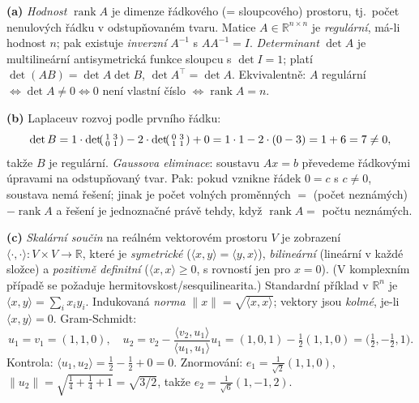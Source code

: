 \begin{reseni}
\textbf{(a)} \emph{Hodnost} $\operatorname{rank}A$ je dimenze řádkového (= sloupcového) prostoru, tj.\ počet nenulových řádku v odstupňovaném tvaru. Matice $A\in\mathbb{R}^{n\times n}$ je \emph{regulární}, má-li hodnost $n$; pak existuje \emph{inverzní} $A^{-1}$ s $AA^{-1}=I$. \emph{Determinant} $\det A$ je multilineární antisymetrická funkce sloupcu s $\det I=1$; platí $\det(AB)=\det A\det B$, $\det A^{\!\top}=\det A$. Ekvivalentně: $A$ regulární $\iff \det A\neq 0 \iff 0$ není vlastní číslo $\iff \operatorname{rank}A=n$.

\textbf{(b)} Laplaceuv rozvoj podle prvního řádku:
\[
\det B = 1\cdot\det\!\begin{psmallmatrix}1&3\\0&1\end{psmallmatrix} -2\cdot\det\!\begin{psmallmatrix}0&3\\1&1\end{psmallmatrix} +0 = 1\cdot 1 -2\cdot(0-3) = 1+6 = 7 \neq 0,
\]
takže $B$ je regulární. \emph{Gaussova eliminace}: soustavu $Ax=b$ převedeme řádkovými úpravami na odstupňovaný tvar. Pak: pokud vznikne řádek $0=c$ s $c\neq0$, soustava nemá řešení; jinak je počet volných proměnných $=$ (počet neznámých) $-\operatorname{rank}A$ a řešení je jednoznačné právě tehdy, když $\operatorname{rank}A=$ počtu neznámých.

\textbf{(c)} \emph{Skalární součin} na reálném vektorovém prostoru $V$ je zobrazení $\langle\cdot,\cdot\rangle:V\times V\to\mathbb{R}$, které je \emph{symetrické} ($\langle x,y\rangle=\langle y,x\rangle$), \emph{bilineární} (lineární v každé složce) a \emph{pozitivně definitní} ($\langle x,x\rangle\ge0$, s rovností jen pro $x=0$). (V komplexním případě se požaduje hermitovskost/sesquilinearita.) Standardní příklad v $\mathbb{R}^n$ je $\langle x,y\rangle=\sum_i x_iy_i$. Indukovaná \emph{norma} $\lVert x\rVert=\sqrt{\langle x,x\rangle}$; vektory jsou \emph{kolmé}, je-li $\langle x,y\rangle=0$. Gram-Schmidt:
\[
u_1=v_1=(1,1,0),\quad u_2=v_2-\frac{\langle v_2,u_1\rangle}{\langle u_1,u_1\rangle}u_1=(1,0,1)-\tfrac12(1,1,0)=\big(\tfrac12,-\tfrac12,1\big).
\]
Kontrola: $\langle u_1,u_2\rangle=\tfrac12-\tfrac12+0=0$. Znormování: $e_1=\tfrac1{\sqrt2}(1,1,0)$, $\lVert u_2\rVert=\sqrt{\tfrac14+\tfrac14+1}=\sqrt{3/2}$, takže $e_2=\tfrac1{\sqrt6}(1,-1,2)$.
\end{reseni}

